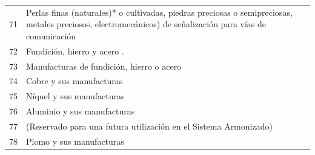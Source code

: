 \documentclass[a4paper,openright,12pt]{book}
\begin{document}
\begin{table}[]
{\begin{tabular}{@{}ll@{}}
    71  & Perlas finas (naturales)* o cultivadas, piedras preciosas o semipreciosas, metales preciosos, electromecánicos) de señalización para vías de comunicación                                                                                                                                      \\
    72  & Fundición, hierro y acero .                                                                                                                                                                                                                                                                    \\
    73  & Manufacturas de fundición, hierro o acero                                                                                                                                                                                                                                                      \\
    74  & Cobre y sus manufacturas                                                                                                                                                                                                                                                                       \\
    75  & Níquel y sus manufacturas                                                                                                                                                                                                                                                                      \\
    76  & Aluminio y sus manufacturas                                                                                                                                                                                                                                                                    \\
    77  & (Reservado para una futura utilización en el Sistema Armonizado)                                                                                                                                                                                                                               \\
    78  & Plomo y sus manufacturas                                                                                                                                                                                                                                                                       \\

\end{tabular}}
\end{table}
\end{document}
